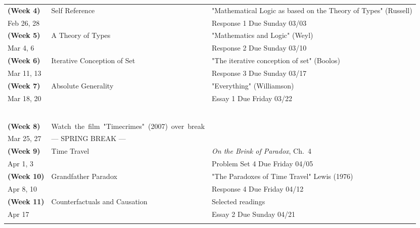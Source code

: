 \documentclass[letterpaper]{infinity_syllabus} %
\begin{document}
\begin{center}
\begin{tabularx}{\textwidth}{p{2.5cm}p{7cm}p{10cm}}
\textbf{(Week 4)} & Self Reference & "Mathematical Logic as based on the Theory of Types" (Russell) \\
Feb 26, 28 &  & Response 1 Due Sunday 03/03\\ 
\arrayrulecolor{maingray}\hline

\textbf{(Week 5)} & A Theory of Types & "Mathematics and Logic" (Weyl) \\
Mar 4, 6 &  & Response 2 Due Sunday 03/10\\
\arrayrulecolor{maingray}\hline

\textbf{(Week 6)} & Iterative Conception of Set & "The iterative conception of set" (Boolos) \\
Mar 11, 13 &  & Response 3 Due Sunday 03/17\\
\arrayrulecolor{maingray}\hline

\textbf{(Week 7)} & Absolute Generality & "Everything" (Williamson) \\
Mar 18, 20 &  &  Essay 1 Due Friday 03/22\\
\arrayrulecolor{maingray}\hline

~\\
\arrayrulecolor{maingray}\hline
\multicolumn{2}{l}{\textbf{\textcolor{myCOLOR}{\large Part 3: Time Travel}}} \\
\hline

  \textbf{(Week 8)} & \mbox{Watch the film "Timecrimes" (2007) over break} &  \\
Mar 25, 27 & --- SPRING BREAK --- &  \\
\arrayrulecolor{maingray}\hline

\textbf{(Week 9)} & Time Travel & \textit{On the Brink of Paradox}, Ch.~4 \\
Apr 1, 3 &  &  Problem Set 4 Due Friday 04/05\\
\arrayrulecolor{maingray}\hline

\textbf{(Week 10)} & Grandfather Paradox & "The Paradoxes of Time Travel" Lewis (1976) \\
Apr 8, 10 &  & Response 4 Due Friday 04/12\\
\arrayrulecolor{maingray}\hline

\textbf{(Week 11)} & Counterfactuals and Causation & Selected readings \\
Apr 17 &  & Essay 2 Due Sunday 04/21\\
\arrayrulecolor{maingray}\hline

\pagebreak


\end{tabularx}
\end{center}
\end{document}
